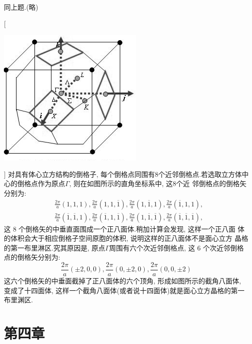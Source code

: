 \documentclass[UTF8,12pt, a4paper, oneside]{ctexart}
\begin{document}
    {同上题.(略)}

    [ \begin{center}
        \includegraphics{picture/3-12.png}
    \end{center}]
    {对具有体心立方结构的倒格子, 每个倒格点同围有8个近邻倒格点.若选取立方体中心的倒格点作为原点$\Gamma$, 则在如图所示的直角坐标系中, 这8个近 邻倒格点的倒格矢分别为:
        \[\begin{aligned}
            &\frac{2 \pi}{a}(1,1,1), \frac{2 \pi}{a}(1,1, \overline{1}), \frac{2 \pi}{a}(1, \overline{1}, 1), \frac{2 \pi}{a}(\overline{1}, 1,1), \\
            &\frac{2 \pi}{a}(\overline{1}, \overline{1}, 1), \frac{2 \pi}{a}(\overline{1}, 1, \overline{1}), \frac{2 \pi}{a}(1, \overline{1}, \overline{1}), \frac{2 \pi}{a}(\overline{1}, \overline{1}, \overline{1}),
            \end{aligned}\]这 8 个倒格矢的中垂直面围成一个正八面体.稍加计算会发现, 这样一个正八面 体的体积会大于相应倒格子空间原胞的体积, 说明这样的正八面体不是面心立方 晶格的第一布里淋区.究其原因是, 原点$\Gamma$周围有六个次近邻倒格点, 这 6 个次近邻倒格点的倒格矢分别为:
            \[\frac{2 \pi}{a}(\pm 2,0,0), \frac{2 \pi}{a}(0, \pm 2,0), \frac{2 \pi}{a}(0,0, \pm 2)\]这六个倒格矢的中垂面截掉了正八面体的六个顶角, 形成如图所示的截角八面体, 变成了十四面体, 这样一个截角八面体(或者说十四面体)就是面心立方晶格的第一布里渊区.}


\section{第四章}

\proi{}{}
\end{document}
